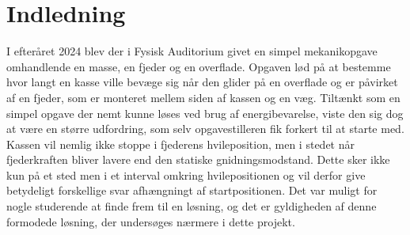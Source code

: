 \chapter{Indledning}
I efteråret 2024 blev der i Fysisk Auditorium givet en simpel mekanikopgave
omhandlende en masse, en fjeder og en overflade. Opgaven lød  på at bestemme hvor
langt en kasse ville bevæge sig når den glider på en overflade og er påvirket af en fjeder, 
som er monteret mellem siden af kassen og en væg. Tiltænkt som en simpel opgave der nemt kunne løses 
ved brug af energibevarelse, viste den sig dog at være en større udfordring, som selv opgavestilleren fik forkert til at starte med.
Kassen vil nemlig ikke stoppe i fjederens hvileposition, men i stedet når fjederkraften bliver lavere end den statiske gnidningsmodstand. Dette sker ikke kun på et sted men
i et interval omkring hvilepositionen og vil derfor give betydeligt forskellige svar 
afhængningt af startpositionen. Det var muligt for nogle studerende at finde frem til en løsning, 
og det er gyldigheden af denne formodede løsning, 
der undersøges nærmere i dette projekt.